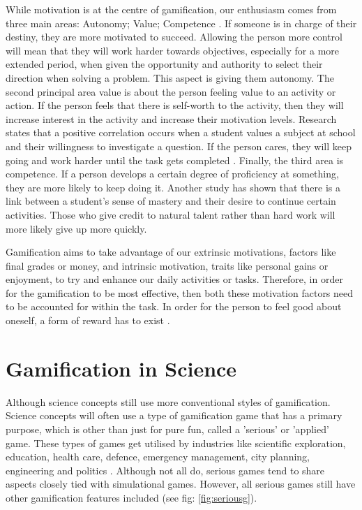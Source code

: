 		While motivation is at the centre of gamification, our enthusiasm comes from three main areas: Autonomy; Value; Competence \cite{keepmotivation}. If someone is in charge of their destiny, they are more motivated to succeed. Allowing the person more control will mean that they will work harder towards objectives, especially for a more extended period, when given the opportunity and authority to select their direction when solving a problem. This aspect is giving them autonomy. The second principal area value is about the person feeling value to an activity or action. If the person feels that there is self-worth to the activity, then they will increase interest in the activity and increase their motivation levels. Research states that a positive correlation occurs when a student values a subject at school and their willingness to investigate a question. If the person cares, they will keep going and work harder until the task gets completed \cite{gamescience, keepmotivation}. Finally, the third area is competence. If a person develops a certain degree of proficiency at something, they are more likely to keep doing it. Another study has shown that there is a link between a student’s sense of mastery and their desire to continue certain activities. Those who give credit to natural talent rather than hard work will more likely give up more quickly.
		
		Gamification aims to take advantage of our extrinsic motivations, factors like final grades or money, and intrinsic motivation, traits like personal gains or enjoyment, to try and enhance our daily activities or tasks. Therefore, in order for the gamification to be most effective, then both these motivation factors need to be accounted for within the task. In order for the person to feel good about oneself, a form of reward has to exist \cite{gamescience}.
			
	\section{Gamification in Science}
		\label{sec:game_in_science}
		
		Although science concepts still use more conventional styles of gamification. Science concepts will often use a type of gamification game that has a primary purpose, which is other than just for pure fun, called a 'serious' or 'applied' game. These types of games get utilised by industries like scientific exploration, education, health care, defence, emergency management, city planning, engineering and politics \cite{wikiserious}. Although not all do, serious games tend to share aspects closely tied with simulational games. However, all serious games still have other gamification features included (see fig: \ref{fig:seriousg}).
		
